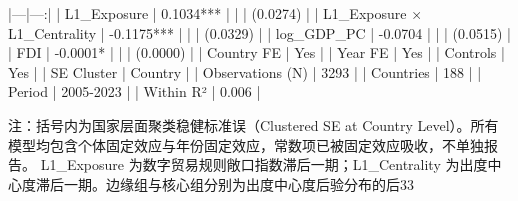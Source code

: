 |---|---:|
| L1_Exposure | 0.1034*** |
|  | (0.0274) |
| L1\_Exposure × L1\_Centrality | -0.1175*** |
|  | (0.0329) |
| log_GDP_PC | -0.0704 |
|  | (0.0515) |
| FDI | -0.0001* |
|  | (0.0000) |
| Country FE | Yes |
| Year FE | Yes |
| Controls | Yes |
| SE Cluster | Country |
| Observations (N) | 3293 |
| Countries | 188 |
| Period | 2005-2023 |
| Within R² | 0.006 |

注：括号内为国家层面聚类稳健标准误（Clustered SE at Country Level）。所有模型均包含个体固定效应与年份固定效应，常数项已被固定效应吸收，不单独报告。
L1_Exposure 为数字贸易规则敞口指数滞后一期；L1_Centrality 为出度中心度滞后一期。边缘组与核心组分别为出度中心度后验分布的后33%